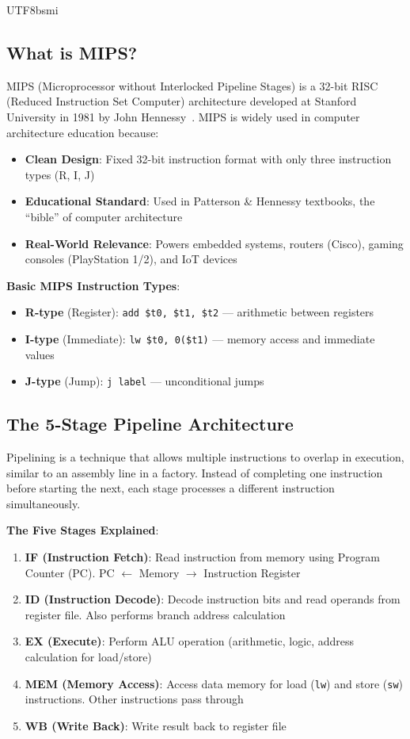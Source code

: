 \documentclass[journal,twoside]{IEEEtran}
\begin{document}
\begin{CJK}{UTF8}{bsmi}
\subsection{What is MIPS?}
MIPS (Microprocessor without Interlocked Pipeline Stages) is a 32-bit RISC (Reduced Instruction Set Computer) architecture developed at Stanford University in 1981 by John Hennessy~\cite{patterson2020computer}. MIPS is widely used in computer architecture education because:
\begin{itemize}
    \item \textbf{Clean Design}: Fixed 32-bit instruction format with only three instruction types (R, I, J)
    \item \textbf{Educational Standard}: Used in Patterson \& Hennessy textbooks, the ``bible'' of computer architecture
    \item \textbf{Real-World Relevance}: Powers embedded systems, routers (Cisco), gaming consoles (PlayStation 1/2), and IoT devices
\end{itemize}

\textbf{Basic MIPS Instruction Types}:
\begin{itemize}
    \item \textbf{R-type} (Register): \texttt{add \$t0, \$t1, \$t2} --- arithmetic between registers
    \item \textbf{I-type} (Immediate): \texttt{lw \$t0, 0(\$t1)} --- memory access and immediate values
    \item \textbf{J-type} (Jump): \texttt{j label} --- unconditional jumps
\end{itemize}

\subsection{The 5-Stage Pipeline Architecture}
Pipelining is a technique that allows multiple instructions to overlap in execution, similar to an assembly line in a factory. Instead of completing one instruction before starting the next, each stage processes a different instruction simultaneously.

\textbf{The Five Stages Explained}:
\begin{enumerate}
    \item \textbf{IF (Instruction Fetch)}: Read instruction from memory using Program Counter (PC). PC $\leftarrow$ Memory $\rightarrow$ Instruction Register
    \item \textbf{ID (Instruction Decode)}: Decode instruction bits and read operands from register file. Also performs branch address calculation
    \item \textbf{EX (Execute)}: Perform ALU operation (arithmetic, logic, address calculation for load/store)
    \item \textbf{MEM (Memory Access)}: Access data memory for load (\texttt{lw}) and store (\texttt{sw}) instructions. Other instructions pass through
    \item \textbf{WB (Write Back)}: Write result back to register file
\end{enumerate}


\end{CJK}
\end{document}
